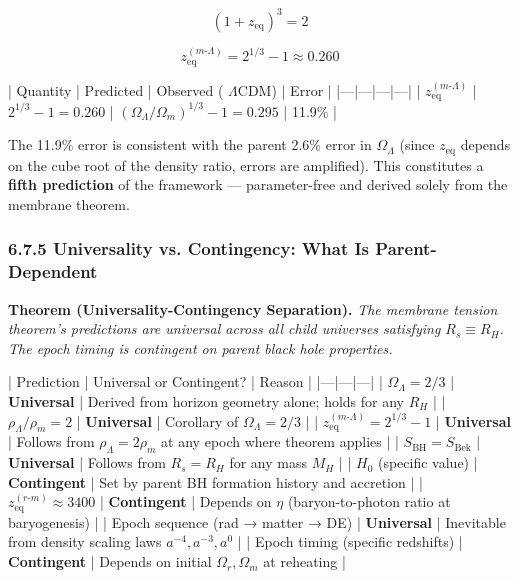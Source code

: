 \documentclass[11pt,a4paper]{article}
\theoremstyle{definition}
\theoremstyle{remark}
\begin{document}
\begin{equation}
(1 + z_{\text{eq}})^3 = 2
\end{equation}



\begin{equation}
\boxed{z_{\text{eq}}^{(m\text{-}\Lambda)} = 2^{1/3} - 1 \approx 0.260}
\end{equation}


| Quantity | Predicted | Observed ( $\Lambda$CDM) | Error |
|---|---|---|---|
| $z_{\text{eq}}^{(m\text{-}\Lambda)}$ | $2^{1/3} - 1 = 0.260$ | $(\Omega_\Lambda/\Omega_m)^{1/3} - 1 = 0.295$ | 11.9\% |

The 11.9\% error is consistent with the parent 2.6\% error in $\Omega_\Lambda$ (since $z_{\text{eq}}$ depends on the cube root of the density ratio, errors are amplified). This constitutes a \textbf{fifth prediction} of the framework — parameter-free and derived solely from the membrane theorem.

\subsubsection{6.7.5 Universality vs. Contingency: What Is Parent-Dependent}

\textbf{Theorem (Universality-Contingency Separation).} \textit{The membrane tension theorem's predictions are universal across all child universes satisfying $R_s \equiv R_H$. The epoch timing is contingent on parent black hole properties.}

| Prediction | Universal or Contingent? | Reason |
|---|---|---|
| $\Omega_\Lambda = 2/3$ | \textbf{Universal} | Derived from horizon geometry alone; holds for any $R_H$ |
| $\rho_\Lambda / \rho_m = 2$ | \textbf{Universal} | Corollary of $\Omega_\Lambda = 2/3$ |
| $z_{\text{eq}}^{(m\text{-}\Lambda)} = 2^{1/3} - 1$ | \textbf{Universal} | Follows from $\rho_\Lambda = 2\rho_m$ at any epoch where theorem applies |
| $S_{\text{BH}} = S_{\text{Bek}}$ | \textbf{Universal} | Follows from $R_s = R_H$ for any mass $M_H$ |
| $H_0$ (specific value) | \textbf{Contingent} | Set by parent BH formation history and accretion |
| $z_{\text{eq}}^{(r\text{-}m)} \approx 3400$ | \textbf{Contingent} | Depends on $\eta$ (baryon-to-photon ratio at baryogenesis) |
| Epoch sequence (rad → matter → DE) | \textbf{Universal} | Inevitable from density scaling laws $a^{-4}, a^{-3}, a^{0}$ |
| Epoch timing (specific redshifts) | \textbf{Contingent} | Depends on initial $\Omega_r, \Omega_m$ at reheating |
\end{document}
